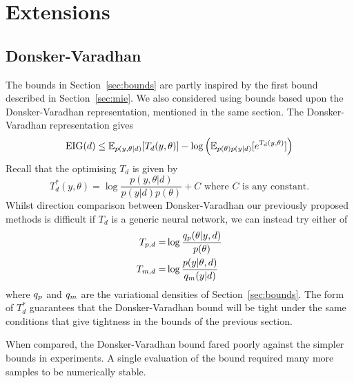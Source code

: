 \section{Extensions}
\subsection{Donsker-Varadhan}
The bounds in Section~\ref{sec:bounds} are partly inspired by the first bound described in Section~\ref{sec:mie}. We also considered using bounds based upon the Donsker-Varadhan representation, mentioned in the same section. The Donsker-Varadhan representation gives
\begin{equation}
	\label{eq:dveig}
	\text{EIG}(d) \le \mathbb{E}_{p(y,\theta|d)} [T_d(y, \theta)] - \log\left(\mathbb{E}_{p(\theta)p(y|d)}[e^{T_d(y,\theta)}] \right)
\end{equation}
Recall that the optimising $T_d$ is given by
\begin{equation}
	T_d^*(y, \theta) = \log\frac{p(y,\theta|d)}{p(y|d)p(\theta)} + C \text{ where }C\text{ is any constant.}
\end{equation}
Whilst direction comparison between Donsker-Varadhan our previously proposed methods is difficult if $T_d$ is a generic neural network, we can instead try either of
\begin{align}
	\label{eq:dvpost}
	T_{p, d} =& \log \frac{q_p(\theta | y,d)}{p(\theta)} \\
	T_{m, d} =& \log \frac{p(y|\theta,d)}{q_m(y|d)}
\end{align}
where $q_p$ and $q_m$ are the variational densities of Section~\ref{sec:bounds}. The form of $T_d^*$ guarantees that the Donsker-Varadhan bound will be tight under the same conditions that give tightness in the bounds of the previous section.

When compared, the Donsker-Varadhan bound fared poorly against the simpler bounds in experiments. A single evaluation of the bound required many more samples to be numerically stable.


